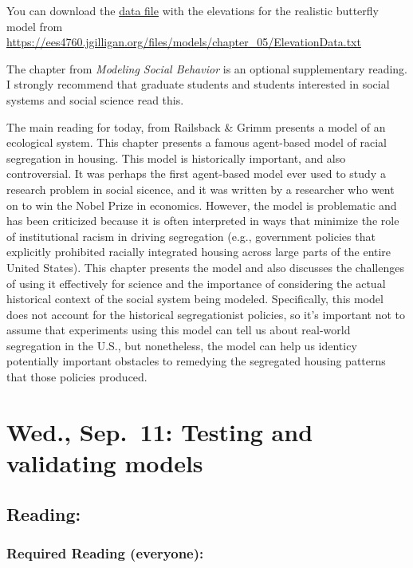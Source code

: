 \documentclass[
]{article}
\begin{document}
You can download the
\href{/files/models/chapter_05/ElevationData.txt}{data file} with the
elevations for the realistic butterfly model from
\url{https://ees4760.jgilligan.org/files/models/chapter_05/ElevationData.txt}

The chapter from \emph{Modeling Social Behavior} is an optional
supplementary reading. I strongly recommend that graduate students and
students interested in social systems and social science read this.

The main reading for today, from Railsback \& Grimm presents a model of
an ecological system. This chapter presents a famous agent-based model
of racial segregation in housing. This model is historically important,
and also controversial. It was perhaps the first agent-based model ever
used to study a research problem in social sicence, and it was written
by a researcher who went on to win the Nobel Prize in economics.
However, the model is problematic and has been criticized because it is
often interpreted in ways that minimize the role of institutional racism
in driving segregation (e.g., government policies that explicitly
prohibited racially integrated housing across large parts of the entire
United States). This chapter presents the model and also discusses the
challenges of using it effectively for science and the importance of
considering the actual historical context of the social system being
modeled. Specifically, this model does not account for the historical
segregationist policies, so it's important not to assume that
experiments using this model can tell us about real-world segregation in
the U.S., but nonetheless, the model can help us identicy potentially
important obstacles to remedying the segregated housing patterns that
those policies produced.

\section{Wed., Sep.~11: Testing and validating
models}\label{wed.-sep.-11-testing-and-validating-models}

\subsection{Reading:}\label{reading-6}

\subsubsection{Required Reading
(everyone):}\label{required-reading-everyone-5}
\end{document}
